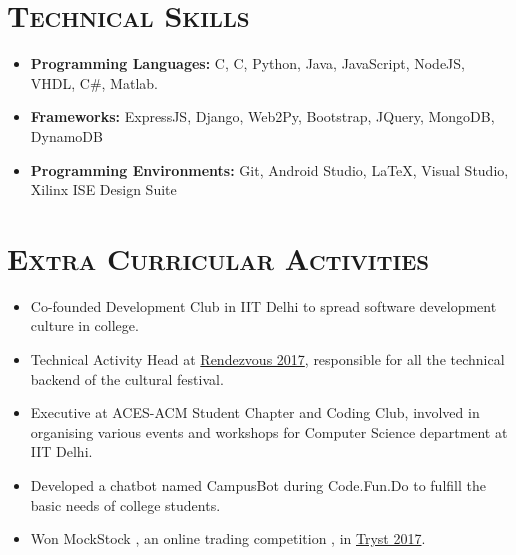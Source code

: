 \documentclass{article}
\newenvironment{longversion}{}{} %
\newcommand{\CPP}
{C\nolinebreak[4]\hspace{-.05em}\raisebox{.22ex}{\footnotesize\bf ++}}
\newcommand{\tmpsection}[1]{}
\let\tmpsection=\section
\renewcommand{\section}[1]{\tmpsection*{\textsc{#1}}}
\begin{document}
\begin{longversion}
\section{Technical Skills}\begin{itemize}
\item \textbf{Programming Languages:}  C, \CPP, Python, Java, JavaScript, NodeJS, VHDL, C\#, Matlab.
\item \textbf{Frameworks:} ExpressJS, Django, Web2Py, Bootstrap, JQuery, MongoDB, DynamoDB

\item \textbf{Programming Environments:} Git, Android Studio, LaTeX, Visual Studio, Xilinx ISE Design Suite

\end{itemize}

\end{longversion}

\section{Extra Curricular Activities}


\begin{itemize}
    \setlength\itemsep{0em}
    \item Co-founded Development Club in IIT Delhi to spread software development culture in college.
    \item Technical Activity Head at \href{http://rdv-iitd.com/}{Rendezvous 2017}, responsible for all the technical backend of the cultural festival.
    \item Executive at ACES-ACM Student Chapter and Coding Club, involved in organising various events and workshops for Computer Science department at IIT Delhi.
    \item Developed a chatbot named CampusBot during Code.Fun.Do to fulfill the basic needs of college students.
    \item Won MockStock , an online trading competition , in \href{http://tryst-iitd.com/iitd}{Tryst 2017}.
     
\end{itemize}
\end{document}
